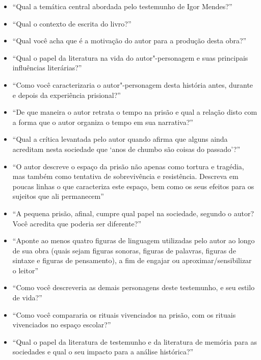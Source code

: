 \documentclass[11pt]{extarticle}
\begin{document}
\begin{itemize}
\item ``Qual a temática central abordada pelo testemunho de Igor
Mendes?''

\item ``Qual o contexto de escrita do livro?''

\item ``Qual você acha que
é a motivação do autor para a produção desta obra?''

\item ``Qual o papel da
literatura na vida do autor"-personagem e suas principais influências
literárias?''

\item ``Como você caracterizaria o autor"-personagem desta
história antes, durante e depois da experiência prisional?''

\item ``De que
maneira o autor retrata o tempo na prisão e qual a relação disto com a
forma que o autor organiza o tempo em sua narrativa?''

\item ``Qual a crítica
levantada pelo autor quando afirma que alguns ainda acreditam nesta
sociedade que `anos de chumbo são coisas do passado'?''

\item ``O autor
descreve o espaço da prisão não apenas como tortura e tragédia, mas
também como tentativa de sobrevivência e resistência. Descreva em poucas
linhas o que caracteriza este espaço, bem como os seus efeitos para os
sujeitos que ali permanecem''

\item ``A pequena prisão, afinal, cumpre qual
papel na sociedade, segundo o autor? Você acredita que poderia ser
diferente?''

\item ``Aponte ao menos quatro figuras de linguagem utilizadas
pelo autor ao longo de sua obra (quais sejam figuras sonoras, figuras de
palavras, figuras de sintaxe e figuras de pensamento), a fim de engajar
ou aproximar/sensibilizar o leitor''

\item ``Como você descreveria as demais
personagens deste testemunho, e seu estilo de vida?''

\item ``Como você
compararia os rituais vivenciados na prisão, com os rituais vivenciados
no espaço escolar?''

\item ``Qual o papel da literatura de testemunho e da
literatura de memória para as sociedades e qual o seu impacto para a
análise histórica?''


\end{itemize}
\end{document}
